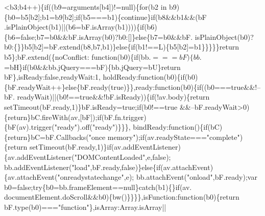 \begin{DoxyCode}
      <b3;b4++)\{\textcolor{keywordflow}{if}((b9=arguments[b4])!=null)\{\textcolor{keywordflow}{for}(b2 in b9)\{b0=b5[b2];b1=b9[b2];\textcolor{keywordflow}{if}(b5===b1)\{\textcolor{keywordflow}{continue}\}\textcolor{keywordflow}{if}(b8&&b1&&(bF
      .isPlainObject(b1)||(b6=bF.isArray(b1))))\{\textcolor{keywordflow}{if}(b6)\{b6=\textcolor{keyword}{false};b7=b0&&bF.isArray(b0)?b0:[]\}\textcolor{keywordflow}{else}\{b7=b0&&bF.
      isPlainObject(b0)?b0:\{\}\}b5[b2]=bF.extend(b8,b7,b1)\}\textcolor{keywordflow}{else}\{\textcolor{keywordflow}{if}(b1!==L)\{b5[b2]=b1\}\}\}\}\}\textcolor{keywordflow}{return} b5\};bF.extend(\{noConflict:\textcolor{keyword}{
      function}(b0)\{\textcolor{keywordflow}{if}(bb.$===bF)\{bb.$=bH\}\textcolor{keywordflow}{if}(b0&&bb.jQuery===bF)\{bb.jQuery=bU\}\textcolor{keywordflow}{return} bF\},isReady:\textcolor{keyword}{false},readyWait:1,
      holdReady:\textcolor{keyword}{function}(b0)\{\textcolor{keywordflow}{if}(b0)\{bF.readyWait++\}\textcolor{keywordflow}{else}\{bF.ready(\textcolor{keyword}{true})\}\},ready:\textcolor{keyword}{function}(b0)\{\textcolor{keywordflow}{if}((b0===\textcolor{keyword}{true}&&!--bF.
      readyWait)||(b0!==\textcolor{keyword}{true}&&!bF.isReady))\{\textcolor{keywordflow}{if}(!av.body)\{\textcolor{keywordflow}{return} setTimeout(bF.ready,1)\}bF.isReady=\textcolor{keyword}{true};\textcolor{keywordflow}{if}(b0!==\textcolor{keyword}{true}
      &&--bF.readyWait>0)\{\textcolor{keywordflow}{return}\}bC.fireWith(av,[bF]);\textcolor{keywordflow}{if}(bF.fn.trigger)\{bF(av).trigger(\textcolor{stringliteral}{"ready"}).off(\textcolor{stringliteral}{"ready"})\}\}\},
      bindReady:\textcolor{keyword}{function}()\{\textcolor{keywordflow}{if}(bC)\{\textcolor{keywordflow}{return}\}bC=bF.Callbacks(\textcolor{stringliteral}{"once memory"});\textcolor{keywordflow}{if}(av.readyState===\textcolor{stringliteral}{"complete"})\{\textcolor{keywordflow}{return} 
      setTimeout(bF.ready,1)\}\textcolor{keywordflow}{if}(av.addEventListener)\{av.addEventListener(\textcolor{stringliteral}{"DOMContentLoaded"},e,\textcolor{keyword}{false});
      bb.addEventListener(\textcolor{stringliteral}{"load"},bF.ready,\textcolor{keyword}{false})\}\textcolor{keywordflow}{else}\{\textcolor{keywordflow}{if}(av.attachEvent)\{av.attachEvent(\textcolor{stringliteral}{"onreadystatechange"},e);
      bb.attachEvent(\textcolor{stringliteral}{"onload"},bF.ready);var b0=\textcolor{keyword}{false};\textcolor{keywordflow}{try}\{b0=bb.frameElement==null\}\textcolor{keywordflow}{catch}(b1)\{\}\textcolor{keywordflow}{if}(av.
      documentElement.doScroll&&b0)\{bw()\}\}\}\},isFunction:\textcolor{keyword}{function}(b0)\{\textcolor{keywordflow}{return} bF.type(b0)===\textcolor{stringliteral}{"function"}\},isArray:Array.isArray||\textcolor{keyword}{
}
\end{DoxyCode}
